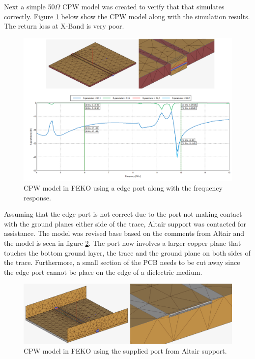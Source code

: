 Next a simple 50$\Omega$ CPW model was created to verify that that simulates correctly. Figure \ref{fig:chp3_CPW_edge_port_combined} below show the CPW model along with the simulation results. The return loss at X-Band is very poor.

    \begin{figure}[H]
    \centering
    \includegraphics[width=0.8\linewidth]{Figures/chp3_CPW_edge_port_combined.png}
    \caption{CPW model in FEKO using a edge port along with the frequency response.}
    \label{fig:chp3_CPW_edge_port_combined}
    \end{figure}

Assuming that the edge port is not correct due to the port not making contact with the ground planes either side of the trace, Altair support was contacted for assistance. The model was revised base based on the comments from Altair and the model is seen in figure \ref{fig:chp3_CPW_altair_port}. The port now involves a larger copper plane that touches the bottom ground layer, the trace and the ground plane on both sides of the trace. Furthermore, a small section of the PCB needs to be cut away since the edge port cannot be place on the edge of a dielectric medium.

    \begin{figure}[H]
    \centering
    \includegraphics[width=0.6\linewidth]{Figures/chp3_CPW_altair_port.png}
    \caption{CPW model in FEKO using the supplied port from Altair support.}
    \label{fig:chp3_CPW_altair_port}
    \end{figure}

